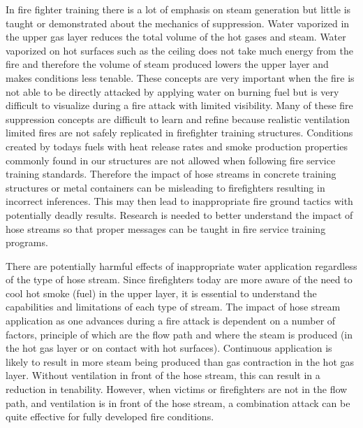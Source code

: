 \documentclass[12pt,oneside]{book}
\begin{document}
In fire fighter training there is a lot of emphasis on steam generation but little is taught or demonstrated about the mechanics of suppression. Water vaporized in the upper gas layer reduces the total volume of the hot gases and steam. Water vaporized on hot surfaces such as the ceiling does not take much energy from the fire and therefore the volume of steam produced lowers the upper layer and makes conditions less tenable. These concepts are very important when the fire is not able to be directly attacked by applying water on burning fuel but is very difficult to visualize during a fire attack with limited visibility. Many of these fire suppression concepts are difficult to learn and refine because realistic ventilation limited fires are not safely replicated in firefighter training structures. Conditions created by todays fuels with heat release rates and smoke production properties commonly found in our structures are not allowed when following fire service training standards. Therefore the impact of hose streams in concrete training structures or metal containers can be misleading to firefighters resulting in incorrect inferences. This may then lead to inappropriate fire ground tactics with potentially deadly results. Research is needed to better understand the impact of hose streams so that proper messages can be taught in fire service training programs.

There are potentially harmful effects of inappropriate water application regardless of the type of hose stream. Since firefighters today are more aware of the need to cool hot smoke (fuel) in the upper layer, it is essential to understand the capabilities and limitations of each type of stream. The impact of hose stream application as one advances during a fire attack is dependent on a number of factors, principle of which are the flow path and where the steam is produced (in the hot gas layer or on contact with hot surfaces). Continuous application is likely to result in more steam being produced than gas contraction in the hot gas layer. Without ventilation in front of the hose stream, this can result in a reduction in tenability. However, when victims or firefighters are not in the flow path, and ventilation is in front of the hose stream, a combination attack can be quite effective for fully developed fire conditions.
\end{document}
